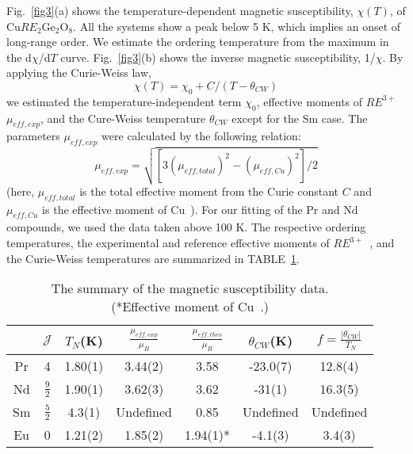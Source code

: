 \documentclass[aps,prl,reprint,amsmath,amssymb,superscriptaddress,showpacs]{revtex4-1}
\begin{document}
Fig.~\ref{fig3}(a) shows the temperature-dependent magnetic susceptibility, $\chi(T)$, of Cu$RE_2$Ge$_2$O$_8$. All the systems show a peak below 5 K, which implies an onset of long-range order. We estimate the ordering temperature from the maximum in the d$\chi$/d$T$ curve. Fig.~\ref{fig3}(b) shows the inverse magnetic susceptibility, 1/$\chi$. By applying the Curie-Weiss law,
\begin{equation}
\chi(T) = \chi_0 + C/(T-\theta_{CW})
\label{CWfit}
\end{equation}
we estimated the temperature-independent term $\chi_0$, effective moments of $RE^{3+}$ $\mu_{eff,exp}$, and the Cure-Weiss temperature $\theta_{CW}$ except for the Sm case. The parameters $\mu_{eff,exp}$ were calculated by the following relation:
\begin{equation}
\mu_{eff,exp} = \sqrt{[3(\mu_{eff,total})^2 - (\mu_{eff,Cu})^2]/2}
\label{mueff}
\end{equation}
(here, $\mu_{eff,total}$ is the total effective moment from the Curie constant $C$ and $\mu_{eff,Cu}$ is the effective moment of Cu~\cite{H.Cho2017}). For our fitting of the Pr and Nd compounds, we used the data taken above 100 K. The respective ordering temperatures, the experimental and reference effective moments of $RE^{3+}$~\cite{S.Blundell2001}, and the Curie-Weiss temperatures are summarized in TABLE~\ref{table2}.

\begin{table}[h]
\caption{\label{table2}The summary of the magnetic susceptibility data.\\(*Effective moment of Cu~\cite{H.Cho2017}.)}
\centering
\renewcommand{\arraystretch}{2}
\begin{tabular}{c c c c c c c}
\hline
\hline
  & $\mathcal{J}$ & $T_N$(K) & $\frac{\mu_{eff,exp}}{\mu_{B}}$ & $\frac{\mu_{eff,theo}}{\mu_{B}}$ & $\theta_{CW}$(K) &$f=\frac{|\theta_{CW}|}{T_N}$\\
 \hline
 Pr & 4 & 1.80(1) & 3.44(2) & 3.58 & -23.0(7) & 12.8(4) \\
 Nd & $\frac{9}{2}$ & 1.90(1) & 3.62(3) & 3.62 & -31(1) & 16.3(5) \\
 Sm & $\frac{5}{2}$ & 4.3(1) & Undefined & 0.85 & Undefined & Undefined\\
 Eu & 0 & 1.21(2) & 1.85(2) & 1.94(1)* & -4.1(3) & 3.4(3) \\
  \hline
  \hline
 \end{tabular}
\end{table}
\end{document}

